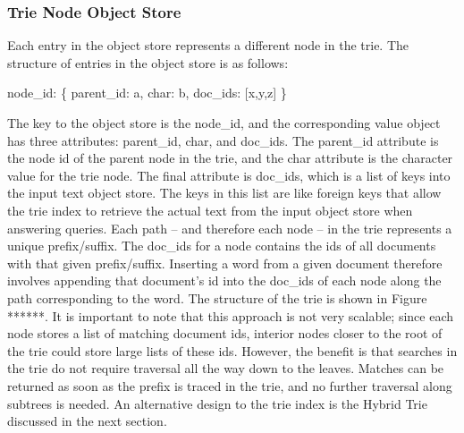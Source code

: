 \documentclass{vldb}
\begin{document}
\subsubsection{Trie Node Object Store}
Each entry in the object store represents a different node in the trie. The structure of entries in the object store is as follows:
\begin{center}
node\_id: \{ parent\_id: a, char: b, doc\_ids: [x,y,z] \}
\end{center}
The key to the object store is the node\_id, and the corresponding value object has three attributes: parent\_id, char, and doc\_ids. The parent\_id attribute is the node id of the parent node in the trie, and the char attribute is the character value for the trie node. The final attribute is doc\_ids, which is a list of keys into the input text object store. The keys in this list are like foreign keys that allow the trie index to retrieve the actual text from the input object store when answering queries. Each path -- and therefore each node -- in the trie represents a unique prefix/suffix. The doc\_ids for a node contains the ids of all documents with that given prefix/suffix. Inserting a word from a given document therefore involves appending that document's id into the doc\_ids of each node along the path corresponding to the word. The structure of the trie is shown in Figure ******.  It is important to note that this approach is not very scalable; since each node stores a list of matching document ids, interior nodes closer to the root of the trie could store large lists of these ids. However, the benefit is that searches in the trie do not require traversal all the way down to the leaves. Matches can be returned as soon as the prefix is traced in the trie, and no further traversal along subtrees is needed. An alternative design to the trie index is the Hybrid Trie discussed in the next section.
\end{document}

